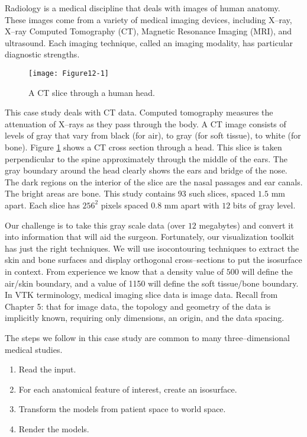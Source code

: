 Radiology is a medical discipline that deals with images of human anatomy.
These images come from a variety of medical imaging devices, including X--ray, X--ray Computed Tomography (CT), Magnetic Resonance Imaging (MRI), and ultrasound. Each imaging technique, called an imaging modality, has particular diagnostic strengths.

\begin{figure}[!htb]
	\centering
	\texttt{[image: Figure12-1]}
	\caption{A CT slice through a human head.}
	\label{fig:Figure12-1}
\end{figure}

This case study deals with CT data. Computed tomography measures the attenuation of X--rays as they pass through the body. A CT image consists of levels of gray that vary from black (for air), to gray (for soft tissue), to white (for bone).  Figure \ref{fig:Figure12-1} shows a CT cross section through a head. This slice is taken perpendicular to the spine approximately through the middle of the ears.  The gray boundary around the head clearly shows the ears and bridge of the nose. The dark regions on the interior of the slice are the nasal passages and ear canals. The bright areas are bone. This study contains 93 such slices, spaced $1.5$ mm apart. Each slice has $256^2$ pixels spaced 0.8 mm apart with $12$ bits of gray level.

Our challenge is to take this gray scale data (over $12$ megabytes) and convert it into information that will aid the surgeon. Fortunately, our visualization toolkit has just the right techniques. We will use isocontouring techniques to extract the skin and bone surfaces and display orthogonal cross--sections to put the isosurface in context. From experience we know that a density value of $500$ will define the air/skin boundary, and a value of 1150 will define the soft tissue/bone boundary. In VTK terminology, medical imaging slice data is image data. Recall from Chapter 5:  that for image data, the topology and geometry of the data is implicitly known, requiring only dimensions, an origin, and the data spacing.

The steps we follow in this case study are common to many three--dimensional medical studies.
\begin{enumerate}

    \item Read the input.

    \item For each anatomical feature of interest, create an isosurface.

    \item Transform the models from patient space to world space.

    \item Render the models.

\end{enumerate}

